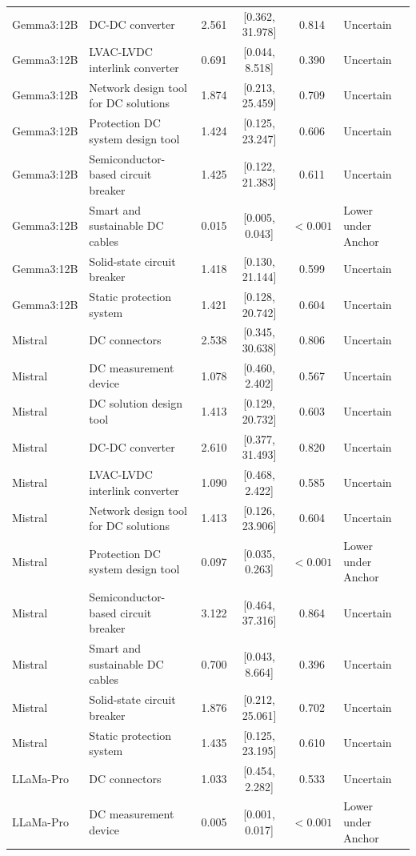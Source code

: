 \begin{longtable}[tbp]{p{2.2cm}p{5.0cm}cccp{3.2cm}}
Gemma3:12B & DC-DC converter & 2.561 & [0.362, 31.978] & 0.814 & Uncertain \\
Gemma3:12B & LVAC-LVDC interlink converter & 0.691 & [0.044, 8.518] & 0.390 & Uncertain \\
Gemma3:12B & Network design tool for DC solutions & 1.874 & [0.213, 25.459] & 0.709 & Uncertain \\
Gemma3:12B & Protection DC system design tool & 1.424 & [0.125, 23.247] & 0.606 & Uncertain \\
Gemma3:12B & Semiconductor-based circuit breaker & 1.425 & [0.122, 21.383] & 0.611 & Uncertain \\
Gemma3:12B & Smart and sustainable DC cables & 0.015 & [0.005, 0.043] & $<0.001$ & Lower under Anchor \\
Gemma3:12B & Solid-state circuit breaker & 1.418 & [0.130, 21.144] & 0.599 & Uncertain \\
Gemma3:12B & Static protection system & 1.421 & [0.128, 20.742] & 0.604 & Uncertain \\
Mistral & DC connectors & 2.538 & [0.345, 30.638] & 0.806 & Uncertain \\
Mistral & DC measurement device & 1.078 & [0.460, 2.402] & 0.567 & Uncertain \\
Mistral & DC solution design tool & 1.413 & [0.129, 20.732] & 0.603 & Uncertain \\
Mistral & DC-DC converter & 2.610 & [0.377, 31.493] & 0.820 & Uncertain \\
Mistral & LVAC-LVDC interlink converter & 1.090 & [0.468, 2.422] & 0.585 & Uncertain \\
Mistral & Network design tool for DC solutions & 1.413 & [0.126, 23.906] & 0.604 & Uncertain \\
Mistral & Protection DC system design tool & 0.097 & [0.035, 0.263] & $<0.001$ & Lower under Anchor \\
Mistral & Semiconductor-based circuit breaker & 3.122 & [0.464, 37.316] & 0.864 & Uncertain \\
Mistral & Smart and sustainable DC cables & 0.700 & [0.043, 8.664] & 0.396 & Uncertain \\
Mistral & Solid-state circuit breaker & 1.876 & [0.212, 25.061] & 0.702 & Uncertain \\
Mistral & Static protection system & 1.435 & [0.125, 23.195] & 0.610 & Uncertain \\
LLaMa-Pro & DC connectors & 1.033 & [0.454, 2.282] & 0.533 & Uncertain \\
LLaMa-Pro & DC measurement device & 0.005 & [0.001, 0.017] & $<0.001$ & Lower under Anchor \\

\end{longtable}
